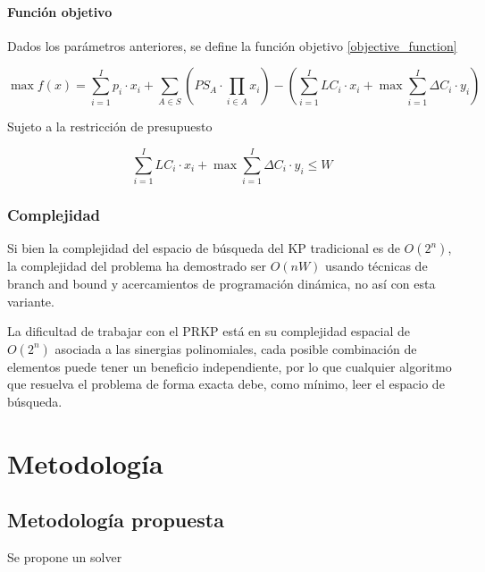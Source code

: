 \documentclass[spanish, a4paper, 12pt, twoside, openany,final]{book}
\numberwithin{equation}{section}                %
\begin{document}
    
    \subsubsection{Función objetivo}
    Dados los parámetros anteriores, se define la función objetivo \ref{objective_function}
    
    \begin{center}
    	
    	\begin{equation}
    		\max f(x) = \sum_{i=1}^I p_i\cdot x_i + 
    		\sum_{A \in S}\left( PS_A \cdot \prod_{i \in A} x_i \right)
    		- \left( \sum_{i=1}^I LC_i\cdot x_i  + \max  \sum_{i=1}^I \Delta C_i\cdot y_i \right)
    		\label{objective_function}
    	\end{equation}
    \end{center}
    
    
    Sujeto a la restricción de presupuesto
    
    \begin{equation}
    	\sum_{i=1}^I LC_i\cdot x_i  + \max \sum_{i=1}^I \Delta C_i\cdot y_i \leq W        
    \end{equation}
    
    
    \subsection{Complejidad}
    Si bien la complejidad del espacio de búsqueda del KP tradicional es de $O\left( 2^n
    \right)$, la complejidad del problema ha demostrado ser $O\left( nW\right)$ usando técnicas de branch and bound y acercamientos de programación dinámica, no así con esta variante.
    
    La dificultad de trabajar con el PRKP está en su complejidad espacial de $O\left( 2^n\right)$ asociada a las sinergias polinomiales, cada posible combinación de elementos puede tener un beneficio independiente, por lo que cualquier algoritmo que resuelva el problema de forma exacta debe, como mínimo, leer el espacio de búsqueda.
\clearpage
  
\chapter{Metodología}
\section{Metodología propuesta}

Se propone un solver
\end{document}
